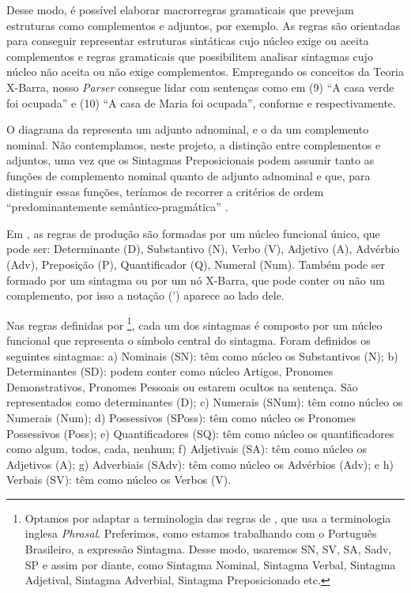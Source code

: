 \documentclass[portuguese]{textolivre}
\begin{document}
Desse modo, é possível elaborar macrorregras gramaticais que prevejam estruturas como complementos e adjuntos, por exemplo. As regras são orientadas para conseguir representar estruturas sintáticas cujo núcleo exige ou aceita complementos e regras gramaticais que possibilitem analisar sintagmas cujo núcleo não aceita ou não exige complementos. Empregando os conceitos da Teoria X-Barra, nosso \textit{Parser} consegue lidar com sentenças como em (9) “A casa verde foi ocupada” e (10) “A casa de Maria foi ocupada”, conforme  e  respectivamente.



O diagrama da  representa um adjunto adnominal, e o da  um complemento nominal. Não contemplamos, neste projeto, a distinção entre complementos e adjuntos, uma vez que os Sintagmas Preposicionais podem assumir tanto as funções de complemento nominal quanto de adjunto adnominal e que, para distinguir essas funções, teríamos de recorrer a critérios de ordem “predominantemente semântico-pragmática” \cite[p. 25]{souza_e_silva_linguistica_2011}.

Em \textcite[p. 142]{othero_gramatica_2009}, as regras de produção são formadas por um núcleo funcional único, que pode ser: Determinante (D), Substantivo (N), Verbo (V), Adjetivo (A), Advérbio (Adv), Preposição (P), Quantificador (Q), Numeral (Num). Também pode ser formado por um sintagma ou por um nó X-Barra, que pode conter ou não um complemento, por isso a notação (’) aparece ao lado dele. 

Nas regras definidas por \textcite[p. 142]{othero_gramatica_2009}\footnote{Optamos por adaptar a terminologia das regras de \textcite{othero_gramatica_2009}, que usa a terminologia inglesa \textit{Phrasal}. Preferimos, como estamos trabalhando com o Português Brasileiro, a expressão Sintagma. Desse modo, usaremos SN, SV, SA, Sadv, SP e assim por diante, como Sintagma Nominal, Sintagma Verbal, Sintagma Adjetival, Sintagma Adverbial, Sintagma Preposicionado etc.}, cada um dos sintagmas é composto por um núcleo funcional que representa o símbolo central do sintagma. Foram definidos os seguintes sintagmas: a) Nominais (SN): têm como núcleo os Substantivos (N); b) Determinantes (SD): podem conter como núcleo Artigos, Pronomes Demonstrativos, Pronomes Pessoais ou estarem ocultos na sentença. São representados como determinantes (D); c) Numerais (SNum): têm como núcleo os Numerais (Num); d) Possessivos (SPoss): têm como núcleo os Pronomes Possessivos (Poss); e) Quantificadores (SQ): têm como núcleo os quantificadores como algum, todos, cada, nenhum; f) Adjetivais (SA): têm como núcleo os Adjetivos (A); g) Adverbiais (SAdv): têm como núcleo os Advérbios (Adv); e h) Verbais (SV): têm como núcleo os Verbos (V).
\end{document}
